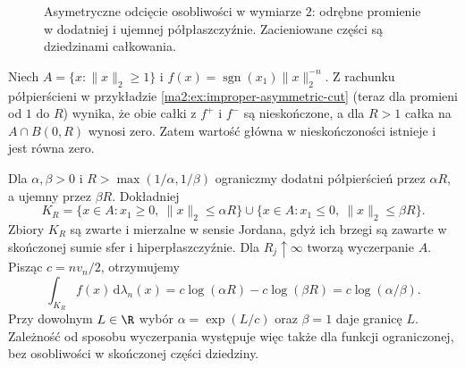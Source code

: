 \begin{figure}[htbp]
\centering
{}
\caption{Asymetryczne odcięcie osobliwości w wymiarze $2$:
odrębne promienie w dodatniej i ujemnej półpłaszczyźnie.
Zacieniowane części są dziedzinami całkowania.}
\label{ma2:fig:improper-asymmetric-cut}
\end{figure}

\begin{przyklad}
\label{ma2:ex:improper-asymmetric-infinity}
Niech $A=\{x:\|x\|_2\ge1\}$ i
$f(x)=\operatorname{sgn}(x_1)\|x\|_2^{-n}$.
Z rachunku półpierścieni w przykładzie
\ref{ma2:ex:improper-asymmetric-cut} (teraz
dla promieni od $1$ do $R$) wynika, że
obie całki z $f^+$ i $f^-$ są nieskończone,
a dla $R>1$ całka na $A\cap B(0,R)$
wynosi zero. Zatem wartość główna w
nieskończoności istnieje i jest równa zero.

Dla $\alpha,\beta>0$ i
$R>\max(1/\alpha,1/\beta)$ ograniczmy
dodatni półpierścień przez $\alpha R$,
a ujemny przez $\beta R$. Dokładniej
\[
 K_R=
 \{x\in A:x_1\ge0,\ \|x\|_2\le\alpha R\}
 \cup
 \{x\in A:x_1\le0,\ \|x\|_2\le\beta R\}.
\]
Zbiory $K_R$ są zwarte i mierzalne
w sensie Jordana, gdyż ich brzegi
są zawarte w skończonej sumie sfer
i hiperpłaszczyźnie. Dla $R_j\uparrow\infty$
tworzą wyczerpanie $A$. Pisząc $c=nv_n/2$,
otrzymujemy
\[
 \int_{K_R}f(x)\,\mathrm d\lambda_n(x)
 =c\log(\alpha R)-c\log(\beta R)
 =c\log(\alpha/\beta).
\]
Przy dowolnym $L\in\R$ wybór
$\alpha=\exp(L/c)$ oraz $\beta=1$ daje
granicę $L$. Zależność od sposobu
wyczerpania występuje więc także dla
funkcji ograniczonej, bez osobliwości
w skończonej części dziedziny.
\end{przyklad}

